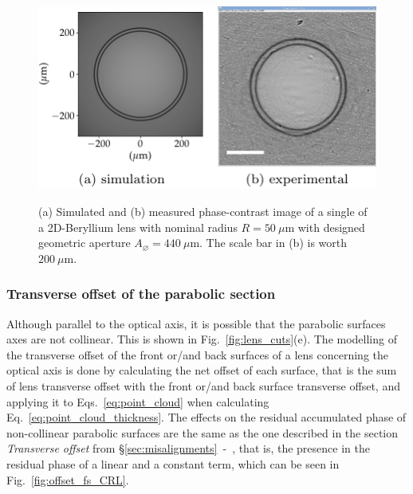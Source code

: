 \begin{refsection}
\begin{figure}[t]
        \centering
        {\includegraphics[height=3.cm]{figures/ch04/longitudinal_offset.pdf}}
        \caption[Effects of the longitudinal offset of the parabolic section]{(a) Simulated and (b) measured phase-contrast image of a single of a 2D-Beryllium lens with nominal radius $R=50~\mu\text{m}$ with designed geometric aperture $A_{\diameter}=440~\mu\text{m}$. The scale bar in (b) is worth $200~\mu$m.} \label{fig:longitudinal_offset}
\end{figure}

\subsubsection*{Transverse offset of the parabolic section}

Although parallel to the optical axis, it is possible that the parabolic surfaces axes are not collinear. This is shown in Fig.~\ref{fig:lens_cuts}(e). The modelling of the transverse offset of the front or/and back surfaces of a lens concerning the optical axis is done by calculating the net offset of each surface, that is the sum of lens transverse offset with the front or/and back surface transverse offset, and applying it to Eqs.~\ref{eq:point_cloud} when calculating Eq.~\ref{eq:point_cloud_thickness}. The effects on the residual accumulated phase of non-collinear parabolic surfaces are the same as the one described in the section \textit{Transverse offset} from \S\ref{sec:misalignments}~-~\textit{}, that is, the presence in the residual phase of a linear and a constant term, which can be seen in Fig.~\ref{fig:offset_fs_CRL}.



\end{refsection}
